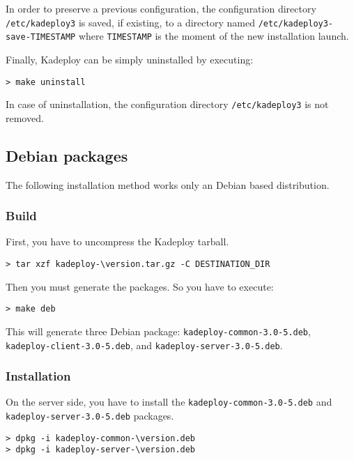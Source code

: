 \documentclass[a4wide,10pt,oneside]{book}
\newcommand{\version}{3.0-5}
\begin{document}
\noindent In order to preserve a previous configuration, the configuration directory \texttt{/etc/kadeploy3} is saved, if existing, to a directory named \texttt{/etc/kadeploy3-save-TIMESTAMP} where \texttt{TIMESTAMP} is the moment of the new installation launch.

\noindent Finally, Kadeploy can be simply uninstalled by executing:
\begin{small}
\begin{verbatim}
> make uninstall
\end{verbatim}
\end{small}

\noindent In case of uninstallation, the configuration directory \texttt{/etc/kadeploy3} is not removed.

\subsection{Debian packages}
The following installation method works only an Debian based distribution.
\subsubsection{Build}
\noindent First, you have to uncompress the Kadeploy tarball. 
\begin{small}
\begin{Verbatim}[commandchars=\\\{\}]
> tar xzf kadeploy-\version.tar.gz -C DESTINATION_DIR
\end{Verbatim}
\end{small}

\noindent Then you must generate the packages. So you have to execute:
\begin{small}
\begin{verbatim}
> make deb
\end{verbatim}
\end{small}
This will generate three Debian package: \texttt{kadeploy-common-\version.deb}, \texttt{kadeploy-client-\version.deb}, and \texttt{kadeploy-server-\version.deb}.
\subsubsection{Installation}
\noindent On the server side, you have to install the \texttt{kadeploy-common-\version.deb} and \texttt{kadeploy-server-\version.deb} packages.
\begin{small}
\begin{Verbatim}[commandchars=\\\{\}]
> dpkg -i kadeploy-common-\version.deb
> dpkg -i kadeploy-server-\version.deb
\end{Verbatim}
\end{small}
\end{document}
